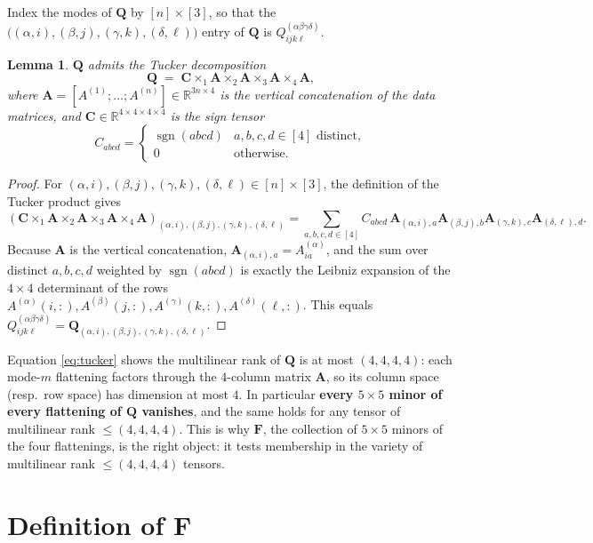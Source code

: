 \documentclass[11pt]{article}
\newcommand{\R}{\mathbb{R}}
\newcommand{\sgn}{\operatorname{sgn}}
\newcommand{\bQ}{\mathbf{Q}}
\newcommand{\bC}{\mathbf{C}}
\newcommand{\bA}{\mathbf{A}}
\newcommand{\bF}{\mathbf{F}}
\newtheorem{lemma}{Lemma}
\begin{document}
Index the modes of $\bQ$ by $[n]\times[3]$, so that the
$\bigl((\alpha,i),(\beta,j),(\gamma,k),(\delta,\ell)\bigr)$ entry of $\bQ$ is
$Q^{(\alpha\beta\gamma\delta)}_{ijk\ell}$.

\begin{lemma}\label{lem:tucker}
$\bQ$ admits the Tucker decomposition
\begin{equation}\label{eq:tucker}
  \bQ \;=\; \bC\times_1\bA\times_2\bA\times_3\bA\times_4\bA,
\end{equation}
where $\bA=[A^{(1)};\dots;A^{(n)}]\in\R^{3n\times4}$ is the vertical
concatenation of the data matrices, and $\bC\in\R^{4\times4\times4\times4}$ is
the sign tensor
\[
  C_{abcd}=\begin{cases}\sgn(abcd) & a,b,c,d\in[4]\text{ distinct},\\ 0 & \text{otherwise.}\end{cases}
\]
\end{lemma}

\begin{proof}
For $(\alpha,i),(\beta,j),(\gamma,k),(\delta,\ell)\in[n]\times[3]$, the
definition of the Tucker product gives
\[
  (\bC\times_1\bA\times_2\bA\times_3\bA\times_4\bA)_{(\alpha,i),(\beta,j),(\gamma,k),(\delta,\ell)}
  =\sum_{a,b,c,d\in[4]}C_{abcd}\,\bA_{(\alpha,i),a}\bA_{(\beta,j),b}\bA_{(\gamma,k),c}\bA_{(\delta,\ell),d}.
\]
Because $\bA$ is the vertical concatenation, $\bA_{(\alpha,i),a}=A^{(\alpha)}_{ia}$,
and the sum over distinct $a,b,c,d$ weighted by $\sgn(abcd)$ is exactly the
Leibniz expansion of the $4\times4$ determinant of the rows
$A^{(\alpha)}(i,:),A^{(\beta)}(j,:),A^{(\gamma)}(k,:),A^{(\delta)}(\ell,:)$.
This equals $Q^{(\alpha\beta\gamma\delta)}_{ijk\ell}=\bQ_{(\alpha,i),(\beta,j),(\gamma,k),(\delta,\ell)}$.
\end{proof}

\noindent Equation \eqref{eq:tucker} shows the multilinear rank of $\bQ$ is at
most $(4,4,4,4)$: each mode-$m$ flattening factors through the $4$-column matrix
$\bA$, so its column space (resp.\ row space) has dimension at most $4$. In
particular \textbf{every $5\times5$ minor of every flattening of $\bQ$ vanishes},
and the same holds for any tensor of multilinear rank $\le(4,4,4,4)$. This is
why $\bF$, the collection of $5\times5$ minors of the four flattenings, is the
right object: it tests membership in the variety of multilinear rank
$\le(4,4,4,4)$ tensors.

\section*{Definition of \texorpdfstring{$\bF$}{F}}
\end{document}
